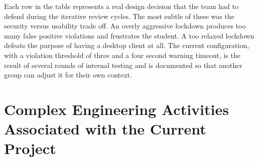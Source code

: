 \documentclass[12pt, a4paper]{report}
\begin{document}
\begin{justify}
  {\fontsize{12}{18}\selectfont
    Each row in the table represents a real design decision that the team had to defend during the iterative review cycles. The most subtle of these was the security versus usability trade off. An overly aggressive lockdown produces too many false positive violations and frustrates the student. A too relaxed lockdown defeats the purpose of having a desktop client at all. The current configuration, with a violation threshold of three and a four second warning timeout, is the result of several rounds of internal testing and is documented so that another group can adjust it for their own context.
  }
\end{justify}

\section{Complex Engineering Activities Associated with the Current Project}
\end{document}
